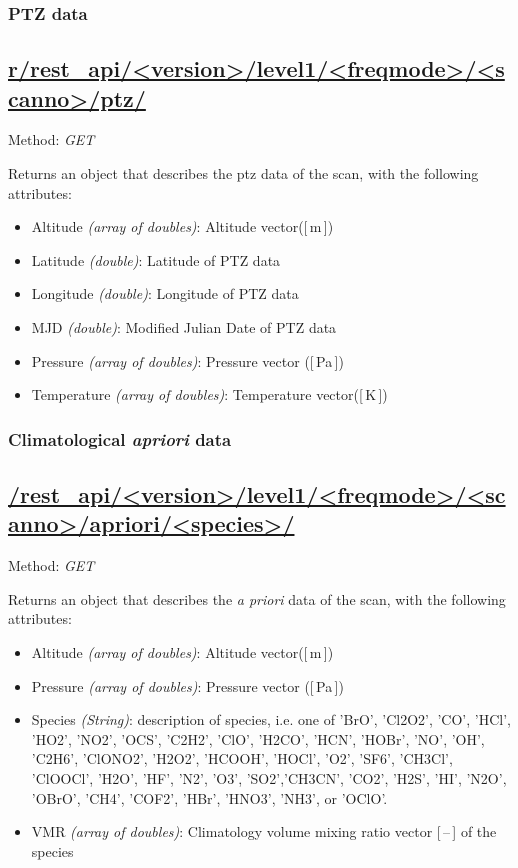 \subsubsection{PTZ data}
\subsection*{\url{r/rest_api/<version>/level1/<freqmode>/<scanno>/ptz/}}
Method: \emph{GET}

Returns an object that describes the ptz data of the scan,
with the following attributes:

\begin{itemize}
    \item Altitude \emph{(array of doubles)}:  Altitude vector([\,m\,])
    \item Latitude \emph{(double)}: Latitude of PTZ data
    \item Longitude \emph{(double)}: Longitude of PTZ data
    \item MJD \emph{(double)}: Modified Julian Date of PTZ data
    \item Pressure \emph{(array of doubles)}: Pressure vector ([\,Pa\,])
    \item Temperature \emph{(array of doubles)}: Temperature vector([\,K\,])
\end{itemize}

\subsubsection{Climatological \textit{apriori} data}
\subsection*{\url{/rest_api/<version>/level1/<freqmode>/<scanno>/apriori/<species>/}}
Method: \emph{GET}

Returns an object that describes the \textit{a priori} data of the scan,
with the following attributes:

\begin{itemize}
    \item Altitude \emph{(array of doubles)}:  Altitude vector([\,m\,])
    \item Pressure \emph{(array of doubles)}: Pressure vector ([\,Pa\,])
    \item Species \emph{(String)}: description of species, i.e. one of 'BrO', 'Cl2O2', 'CO',
          'HCl', 'HO2', 'NO2', 'OCS', 'C2H2', 'ClO', 'H2CO', 'HCN', 'HOBr', 'NO', 'OH', 'C2H6',
          'ClONO2', 'H2O2', 'HCOOH', 'HOCl', 'O2', 'SF6', 'CH3Cl', 'ClOOCl', 'H2O', 'HF', 'N2', 'O3',
          'SO2','CH3CN', 'CO2', 'H2S', 'HI', 'N2O', 'OBrO', 'CH4', 'COF2', 'HBr', 'HNO3', 'NH3', or 'OClO'.
   \item VMR \emph{(array of doubles)}: Climatology volume mixing ratio vector [\,--\,] of the species
\end{itemize}



